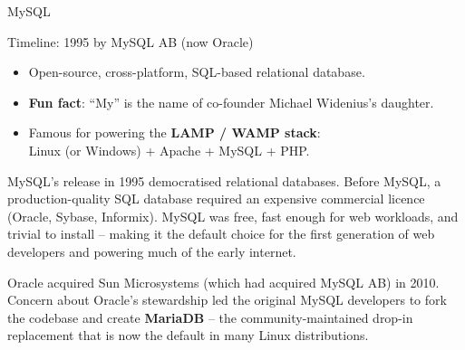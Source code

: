 \begin{frame}{MySQL}
  \begin{block}{Timeline: 1995 by MySQL AB (now Oracle)}
    \begin{itemize}
      \item Open-source, cross-platform, SQL-based relational database.
      \item \textbf{Fun fact}: ``My'' is the name of co-founder
            Michael Widenius's daughter.
      \item Famous for powering the \textbf{LAMP / WAMP stack}:\\
            Linux (or Windows) + Apache + MySQL + PHP.
    \end{itemize}
  \end{block}

  MySQL's release in 1995 democratised relational databases.  Before MySQL,
  a production-quality SQL database required an expensive commercial licence
  (Oracle, Sybase, Informix).  MySQL was free, fast enough for web workloads,
  and trivial to install -- making it the default choice for the first
  generation of web developers and powering much of the early internet.

  \medskip
  Oracle acquired Sun Microsystems (which had acquired MySQL AB) in 2010.
  Concern about Oracle's stewardship led the original MySQL developers to fork
  the codebase and create \textbf{MariaDB} -- the community-maintained drop-in
  replacement that is now the default in many Linux distributions.
\end{frame}

